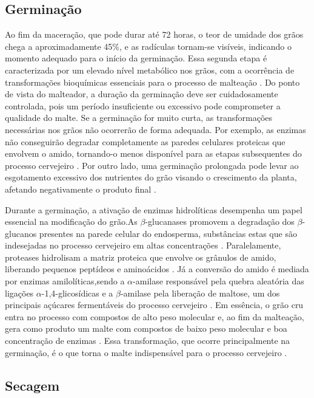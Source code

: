 \subsection{Germinação}

Ao fim da maceração, que pode durar até 72 horas, o teor de umidade dos grãos chega a aproximadamente 45\%, e as radículas tornam-se visíveis, indicando o momento adequado para o início da germinação. Essa segunda etapa é caracterizada por um elevado nível metabólico nos grãos, com a ocorrência de transformações bioquímicas essenciais para o processo de malteação \cite{MALLETT2022}. Do ponto de vista do malteador, a duração da germinação deve ser cuidadosamente controlada, pois um período insuficiente ou excessivo pode comprometer a qualidade do malte. Se a germinação for muito curta, as transformações necessárias nos grãos não ocorrerão de forma adequada. Por exemplo, as enzimas não conseguirão degradar completamente as paredes celulares proteicas que envolvem o amido, tornando-o menos disponível para as etapas subsequentes do processo cervejeiro \cite{FOX2009}. Por outro lado, uma germinação prolongada pode levar ao esgotamento excessivo dos nutrientes do grão visando o crescimento da planta, afetando negativamente o produto final \cite{LEWIS2012}.

Durante a germinação, a ativação de enzimas hidrolíticas desempenha um papel essencial na modificação do grão.As $\beta$-glucanases promovem a degradação dos $\beta$-glucanos presentes na parede celular do endosperma, substâncias estas que são indesejadas no processo cervejeiro em altas concentrações \cite{LEWIS2012}. Paralelamente, proteases hidrolisam a matriz proteica que envolve os grânulos de amido, liberando pequenos peptídeos e aminoácidos \cite{FOX2009,GUPTA2010}. Já a conversão do amido é mediada por enzimas amilolíticas,sendo a $\alpha$-amilase responsável pela quebra aleatória das ligações $\alpha$-1,4-glicosídicas e a $\beta$-amilase pela liberação de maltose, um dos principais açúcares fermentáveis do processo cervejeiro \cite{GUPTA2010,MALLETT2022}. Em essência, o grão cru entra no processo com compostos de alto peso molecular e, ao fim da malteação, gera como produto um malte com compostos de baixo peso molecular e boa concentração de enzimas \cite{KUNZE1996}. Essa transformação, que ocorre principalmente na germinação, é o que torna o malte indispensável para o processo cervejeiro \cite{CENCI2021}.

\subsection{Secagem}

